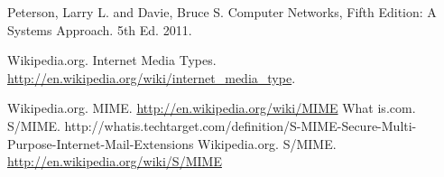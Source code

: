 \documentclass[twocolumn,showpacs,%
  nofootinbib,aps,superscriptaddress,%
  eqsecnum,prd,notitlepage,showkeys,10pt]{revtex4-1}
\begin{document}




\begin{thebibliography}{9}

 Peterson, Larry L. and Davie, Bruce S. Computer Networks, Fifth Edition: A Systems Approach. 5th Ed. 2011.

 Wikipedia.org. Internet Media Types. \url{http://en.wikipedia.org/wiki/internet_media_type}.

 Wikipedia.org. MIME. \url{http://en.wikipedia.org/wiki/MIME}
 What is.com. S/MIME.  http://whatis.techtarget.com/definition/S-MIME-Secure-Multi-Purpose-Internet-Mail-Extensions
 Wikipedia.org. S/MIME. 
\url{http://en.wikipedia.org/wiki/S/MIME}




\end{thebibliography}
\end{document}
